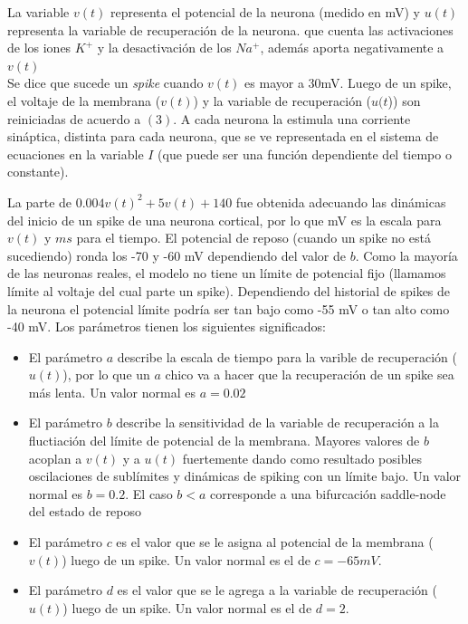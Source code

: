 \documentclass[12pt]{article}
\begin{document}
La variable $v(t)$ representa el potencial de la neurona (medido en mV) y $u(t)$ representa la variable de recuperación de la neurona.
que cuenta las activaciones de los iones $K^{+}$ y la desactivación de los $Na^{+}$, además aporta negativamente a $v(t)$ \\

Se dice que sucede un \textit{spike} cuando $v(t)$ es mayor a 30mV. Luego de un spike, el voltaje de la membrana ($v(t)$) y la variable de recuperación ($u(t$)) son reiniciadas de acuerdo a $(3)$.
A cada neurona la estimula una corriente sináptica, distinta para cada neurona, que se ve representada en el sistema de ecuaciones en la variable $I$ (que puede ser una función dependiente del tiempo o constante).

La parte de $0.004v(t)^2 + 5v(t) + 140$ fue obtenida adecuando las dinámicas del inicio de un spike de una neurona cortical, por lo que mV es la escala para $v(t)$ y $ms$ para el tiempo.
El potencial de reposo (cuando un spike no está sucediendo) ronda los -70 y -60 mV dependiendo del valor de $b$. Como la mayoría de las neuronas reales, el modelo no tiene un límite de potencial fijo (llamamos límite al voltaje del cual parte un spike).
Dependiendo del historial de spikes de la neurona el potencial límite podría ser tan bajo como -55 mV o tan alto como -40 mV.
Los parámetros tienen los siguientes significados:
\begin{itemize}
    \item El parámetro $a$ describe la escala de tiempo para la varible de recuperación ($u(t)$), por lo que un $a$ chico va a hacer que la recuperación de un spike sea más lenta. Un valor normal es $a = 0.02$
    \item El parámetro $b$ describe la sensitividad de la variable de recuperación a la fluctiación del límite de potencial de la membrana. Mayores valores de $b$ acoplan a $v(t)$ y a $u(t)$ fuertemente dando como resultado
posibles oscilaciones de sublímites y dinámicas de spiking con un límite bajo. Un valor normal es $b = 0.2$. El caso $b < a$ corresponde a una bifurcación saddle-node del estado de reposo \cite{modeloPrimero}
    \item El parámetro $c$ es el valor que se le asigna al potencial de la membrana ($v(t)$) luego de un spike. Un valor normal es el de $c = -65 mV$.
    \item El parámetro $d$ es el valor que se le agrega a la variable de recuperación ($u(t)$) luego de un spike. Un valor normal es el de $d = 2$.
\end{itemize}
\end{document}
